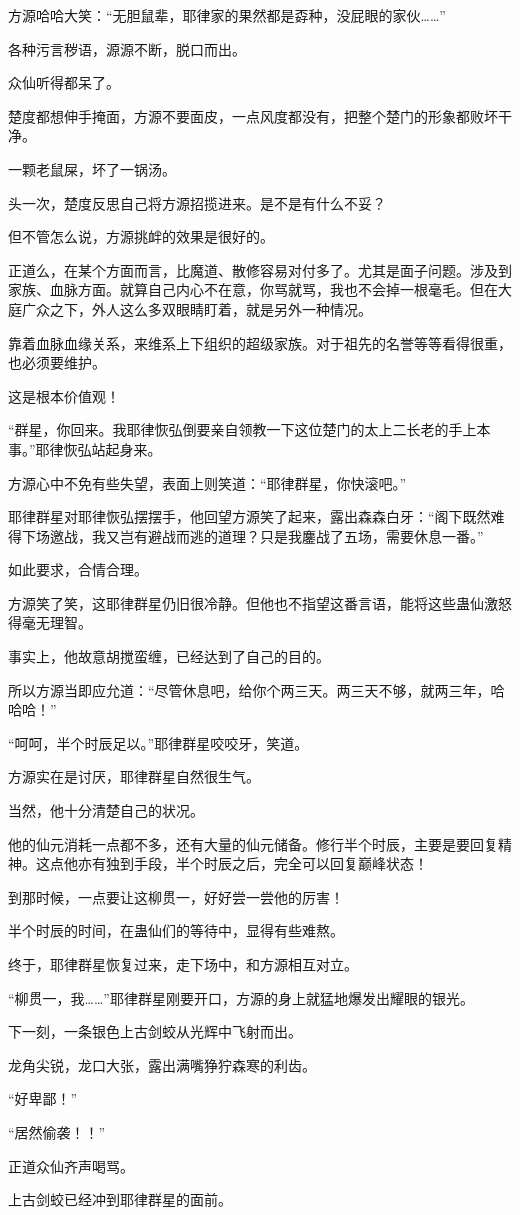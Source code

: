 \begin{this_body}
方源哈哈大笑：“无胆鼠辈，耶律家的果然都是孬种，没屁眼的家伙……”

各种污言秽语，源源不断，脱口而出。

众仙听得都呆了。

楚度都想伸手掩面，方源不要面皮，一点风度都没有，把整个楚门的形象都败坏干净。

一颗老鼠屎，坏了一锅汤。

头一次，楚度反思自己将方源招揽进来。是不是有什么不妥？

但不管怎么说，方源挑衅的效果是很好的。

正道么，在某个方面而言，比魔道、散修容易对付多了。尤其是面子问题。涉及到家族、血脉方面。就算自己内心不在意，你骂就骂，我也不会掉一根毫毛。但在大庭广众之下，外人这么多双眼睛盯着，就是另外一种情况。

靠着血脉血缘关系，来维系上下组织的超级家族。对于祖先的名誉等等看得很重，也必须要维护。

这是根本价值观！

“群星，你回来。我耶律恢弘倒要亲自领教一下这位楚门的太上二长老的手上本事。”耶律恢弘站起身来。

方源心中不免有些失望，表面上则笑道：“耶律群星，你快滚吧。”

耶律群星对耶律恢弘摆摆手，他回望方源笑了起来，露出森森白牙：“阁下既然难得下场邀战，我又岂有避战而逃的道理？只是我鏖战了五场，需要休息一番。”

如此要求，合情合理。

方源笑了笑，这耶律群星仍旧很冷静。但他也不指望这番言语，能将这些蛊仙激怒得毫无理智。

事实上，他故意胡搅蛮缠，已经达到了自己的目的。

所以方源当即应允道：“尽管休息吧，给你个两三天。两三天不够，就两三年，哈哈哈！”

“呵呵，半个时辰足以。”耶律群星咬咬牙，笑道。

方源实在是讨厌，耶律群星自然很生气。

当然，他十分清楚自己的状况。

他的仙元消耗一点都不多，还有大量的仙元储备。修行半个时辰，主要是要回复精神。这点他亦有独到手段，半个时辰之后，完全可以回复巅峰状态！

到那时候，一点要让这柳贯一，好好尝一尝他的厉害！

半个时辰的时间，在蛊仙们的等待中，显得有些难熬。

终于，耶律群星恢复过来，走下场中，和方源相互对立。

“柳贯一，我……”耶律群星刚要开口，方源的身上就猛地爆发出耀眼的银光。

下一刻，一条银色上古剑蛟从光辉中飞射而出。

龙角尖锐，龙口大张，露出满嘴狰狞森寒的利齿。

“好卑鄙！”

“居然偷袭！！”

正道众仙齐声喝骂。

上古剑蛟已经冲到耶律群星的面前。

\end{this_body}

